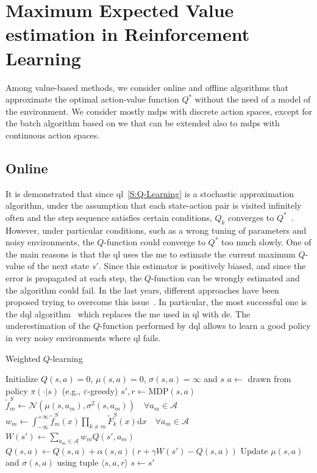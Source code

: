 \section{Maximum Expected Value estimation in Reinforcement Learning}
Among value-based methods, we consider online and offline algorithms that approximate the optimal action-value function $Q^*$ without the need of a model of the environment. We consider mostly \glspl{mdp} with discrete action spaces, except for the batch algorithm based on \gls{we} that can be extended also to \glspl{mdp} with continuous action spaces.

\subsection{Online}
It is demonstrated that since \gls{ql}~\ref{S:Q-Learning} is a stochastic approximation algorithm, under the assumption that each state-action pair is visited infinitely often and the step sequence satisfies certain conditions, $Q_k$ converges to $Q^{*}$~\cite{watkins1989learning}. However, under particular conditions, such as a wrong tuning of parameters and noisy environments, the $Q$-function could converge to $Q^{*}$ too much slowly. One of the main reasons is that the \gls{ql} uses the \gls{me} to estimate the current maximum $Q$-value of the next state $s'$. Since this estimator is positively biased, and since the error is propagated at each step, the $Q$-function can be wrongly estimated and the algorithm could fail.
In the last years, different approaches have been proposed trying to overcome this issue~\cite{lee2013bias,bellemare2015increasing,ijcai2017-483}. In particular, the most successful one is the \gls{dql} algorithm~\cite{van2010double} which replaces the \gls{me} used in \gls{ql} with \gls{de}. The underestimation of the $Q$-function performed by \gls{dql} allows to learn a good policy in very noisy environments where \gls{ql} fails.

\begin{algorithm}[t]
\caption{Weighted $Q$-learning}
\label{A:WQ-Learning}
\begin{algorithmic}[1]
\STATE Initialize $Q(s,a) = 0$, $\mu(s,a) = 0$, $\sigma(s,a) = \infty$ and $s$
\REPEAT
\STATE $a \leftarrow$ drawn from policy $\pi(\cdot|s)$ (e.g., $\varepsilon$-greedy)
\STATE $s',r \leftarrow \text{MDP}(s,a)$
\STATE $\tilde{f}_m^S \leftarrow \mathcal{N}(\mu(s,a_m), \sigma^2(s,a_m))\quad \forall a_m \in \mathcal{A}$ 
\STATE $w_m \leftarrow \int_{-\infty}^{+\infty} \tilde{f}_m^S(x) \prod_{k\neq m} \tilde{F}^S_k(x) \mathrm{d}x \quad \forall a_m \in \mathcal{A}$
\STATE $W(s') \leftarrow \sum_{a_m \in \mathcal{A}} w_m Q(s',a_m)$
\STATE $Q(s,a) \leftarrow Q(s,a) + \alpha(s,a) (r + \gamma W(s') - Q(s,a))$
\STATE Update $\mu(s,a)$ and $\sigma(s,a)$ using tuple $\langle s,a,r \rangle$
\STATE $s \leftarrow s'$
\end{algorithmic}
\end{algorithm}

